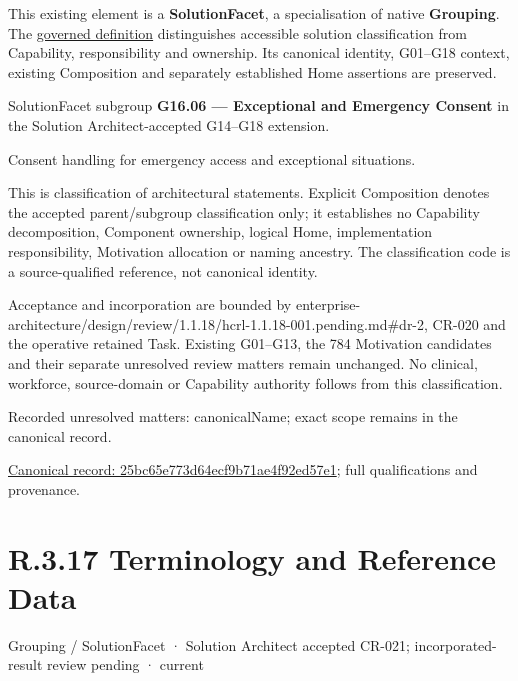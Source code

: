 This existing element is a \textbf{SolutionFacet}, a specialisation of native
\textbf{Grouping}. The \href{\detokenize{../../../../../../../governance/continuum-representation.md#solutionfacet-classification--1119-candidate}}{governed definition}
distinguishes accessible solution classification from Capability, responsibility
and ownership. Its canonical identity, G01–G18 context, existing Composition
and separately established Home assertions are preserved.



SolutionFacet subgroup \textbf{G16.06 — Exceptional and Emergency Consent} in the Solution Architect-accepted G14–G18 extension.



Consent handling for emergency access and exceptional situations.



This is classification of architectural statements. Explicit Composition denotes the accepted parent/subgroup classification only; it establishes no Capability decomposition, Component ownership, logical Home, implementation responsibility, Motivation allocation or naming ancestry. The classification code is a source-qualified reference, not canonical identity.



Acceptance and incorporation are bounded by enterprise-architecture/design/review/1.1.18/hcrl-1.1.18-001.pending.md\#dr-2, CR-020 and the operative retained Task. Existing G01–G13, the 784 Motivation candidates and their separate unresolved review matters remain unchanged. No clinical, workforce, source-domain or Capability authority follows from this classification.


{\small Recorded unresolved matters: canonicalName; exact scope remains in the canonical record.}\par
{\footnotesize \href{../../../../../../../continuum/grouping/25bc65e773d64ecf9b71ae4f92ed57e1.md}{Canonical record: 25bc65e773d64ecf9b71ae4f92ed57e1}; full qualifications and provenance.}\par
\section*{R.3.17 Terminology and Reference Data}
\label{navigation:R.3.17}

\label{element:8b27323cbaba400698842f77e0d28c0d}
{\small Grouping / SolutionFacet · Solution Architect accepted CR-021; incorporated-result review pending · current}\par

